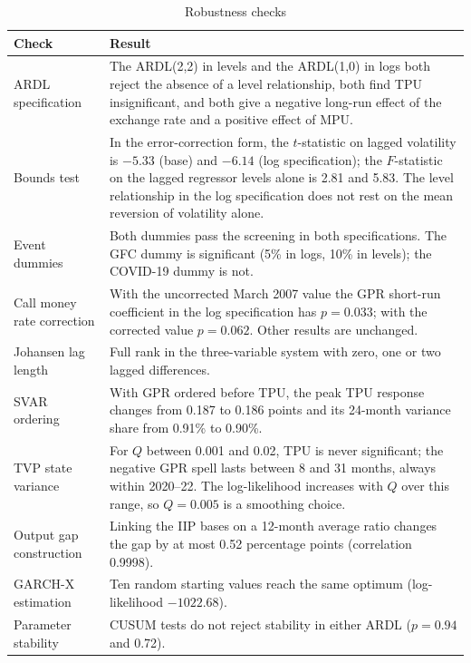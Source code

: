 \documentclass[10pt,twocolumn,a4paper]{article}
\begin{document}
\begin{table}[!t]\centering\small
\caption{Robustness checks}\label{tab:rob}
\begin{tabularx}{\textwidth}{>{\raggedright\arraybackslash}p{3.8cm} L}
\toprule
Check & Result \\
\midrule
ARDL specification & The ARDL(2,2) in levels and the ARDL(1,0) in logs both reject the absence of a level relationship, both find TPU insignificant, and both give a negative long-run effect of the exchange rate and a positive effect of MPU. \\
Bounds test & In the error-correction form, the $t$-statistic on lagged volatility is $-5.33$ (base) and $-6.14$ (log specification); the $F$-statistic on the lagged regressor levels alone is 2.81 and 5.83. The level relationship in the log specification does not rest on the mean reversion of volatility alone. \\
Event dummies & Both dummies pass the screening in both specifications. The GFC dummy is significant (5\% in logs, 10\% in levels); the COVID-19 dummy is not. \\
Call money rate correction & With the uncorrected March 2007 value the GPR short-run coefficient in the log specification has $p=0.033$; with the corrected value $p=0.062$. Other results are unchanged. \\
Johansen lag length & Full rank in the three-variable system with zero, one or two lagged differences. \\
SVAR ordering & With GPR ordered before TPU, the peak TPU response changes from 0.187 to 0.186 points and its 24-month variance share from 0.91\% to 0.90\%. \\
TVP state variance & For $Q$ between 0.001 and 0.02, TPU is never significant; the negative GPR spell lasts between 8 and 31 months, always within 2020--22. The log-likelihood increases with $Q$ over this range, so $Q=0.005$ is a smoothing choice. \\
Output gap construction & Linking the IIP bases on a 12-month average ratio changes the gap by at most 0.52 percentage points (correlation 0.9998). \\
GARCH-X estimation & Ten random starting values reach the same optimum (log-likelihood $-1022.68$). \\
Parameter stability & CUSUM tests do not reject stability in either ARDL ($p=0.94$ and 0.72). \\
\bottomrule
\end{tabularx}
\end{table}
\end{document}
